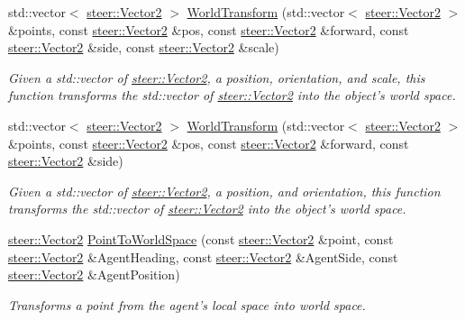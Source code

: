 \begin{DoxyCompactItemize}
\item 
std\-::vector$<$ \hyperlink{structsteer_1_1_vector2}{steer\-::\-Vector2} $>$ \hyperlink{namespacesteer_a254eb8e4d720d0f70f0177a680ad37ad}{World\-Transform} (std\-::vector$<$ \hyperlink{structsteer_1_1_vector2}{steer\-::\-Vector2} $>$ \&points, const \hyperlink{structsteer_1_1_vector2}{steer\-::\-Vector2} \&pos, const \hyperlink{structsteer_1_1_vector2}{steer\-::\-Vector2} \&forward, const \hyperlink{structsteer_1_1_vector2}{steer\-::\-Vector2} \&side, const \hyperlink{structsteer_1_1_vector2}{steer\-::\-Vector2} \&scale)
\begin{DoxyCompactList}\small\item\em Given a std\-::vector of \hyperlink{structsteer_1_1_vector2}{steer\-::\-Vector2}, a position, orientation, and scale, this function transforms the std\-::vector of \hyperlink{structsteer_1_1_vector2}{steer\-::\-Vector2} into the object's world space. \end{DoxyCompactList}\item 
std\-::vector$<$ \hyperlink{structsteer_1_1_vector2}{steer\-::\-Vector2} $>$ \hyperlink{namespacesteer_af402cf7f7bd95b6b47f5dce33e9eb190}{World\-Transform} (std\-::vector$<$ \hyperlink{structsteer_1_1_vector2}{steer\-::\-Vector2} $>$ \&points, const \hyperlink{structsteer_1_1_vector2}{steer\-::\-Vector2} \&pos, const \hyperlink{structsteer_1_1_vector2}{steer\-::\-Vector2} \&forward, const \hyperlink{structsteer_1_1_vector2}{steer\-::\-Vector2} \&side)
\begin{DoxyCompactList}\small\item\em Given a std\-::vector of \hyperlink{structsteer_1_1_vector2}{steer\-::\-Vector2}, a position, and orientation, this function transforms the std\-::vector of \hyperlink{structsteer_1_1_vector2}{steer\-::\-Vector2} into the object's world space. \end{DoxyCompactList}\item 
\hyperlink{structsteer_1_1_vector2}{steer\-::\-Vector2} \hyperlink{namespacesteer_a17cb909cb8d7f4c1dd087c84bbd7320e}{Point\-To\-World\-Space} (const \hyperlink{structsteer_1_1_vector2}{steer\-::\-Vector2} \&point, const \hyperlink{structsteer_1_1_vector2}{steer\-::\-Vector2} \&Agent\-Heading, const \hyperlink{structsteer_1_1_vector2}{steer\-::\-Vector2} \&Agent\-Side, const \hyperlink{structsteer_1_1_vector2}{steer\-::\-Vector2} \&Agent\-Position)
\begin{DoxyCompactList}\small\item\em Transforms a point from the agent's local space into world space. \end{DoxyCompactList}\item 

\end{DoxyCompactItemize}

